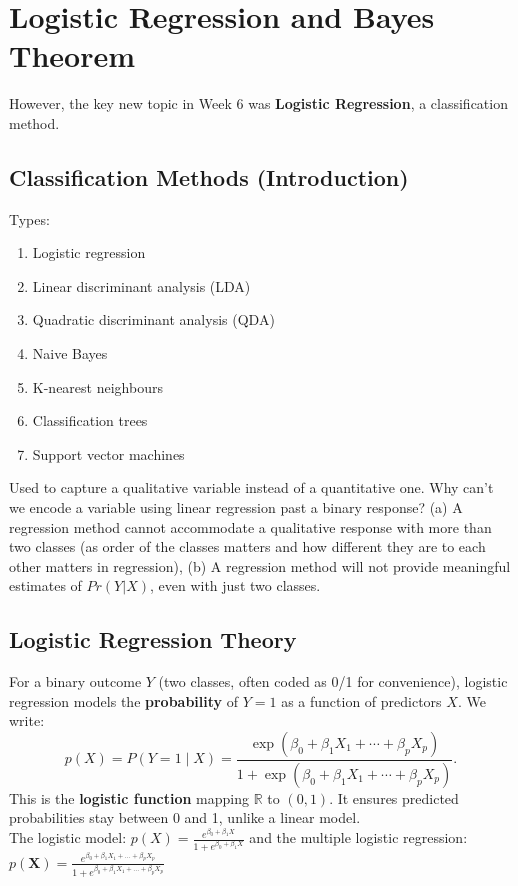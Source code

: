 \documentclass[11pt]{article}
\begin{document}
\section{Logistic Regression and Bayes Theorem}

However, the key new topic in Week 6 was \textbf{Logistic Regression}, a classification method.

\subsection{Classification Methods (Introduction)}
Types:
\begin{enumerate}
    \item Logistic regression
    \item Linear discriminant analysis (LDA)
    \item Quadratic discriminant analysis (QDA)
    \item Naive Bayes
    \item K-nearest neighbours
    \item Classification trees
    \item Support vector machines
\end{enumerate}
\vspace{1em} \noindent Used to capture a qualitative variable instead of a quantitative one. Why can't we encode a variable using linear regression past a binary response? (a) A regression method cannot accommodate a qualitative response with more than two classes (as order of the classes matters and how different they are to each other matters in regression), (b) A regression method will not provide meaningful estimates of $Pr(Y|X)$, even with just two classes.


\subsection{Logistic Regression Theory}
For a binary outcome $Y$ (two classes, often coded as 0/1 for convenience), logistic regression models the \textbf{probability} of $Y=1$ as a function of predictors $X$. We write:
\[ p(X) = P(Y=1 \mid X) = \frac{\exp(\beta_0 + \beta_1 X_1 + \cdots + \beta_p X_p)}{1 + \exp(\beta_0 + \beta_1 X_1 + \cdots + \beta_p X_p)}. \]
This is the \textbf{logistic function} mapping $\mathbb{R}$ to $(0,1)$. It ensures predicted probabilities stay between 0 and 1, unlike a linear model. \\

\noindent The logistic model: $p(X) = \frac{e^{\beta_{0}  + \beta_{1}X}}{1 + e^{\beta_{0} + \beta_{1}X}}$ and the multiple logistic regression: $p(\boldsymbol{X}) = \frac{e^{\beta_{0} + \beta_{1}X_{1} + ... + \beta_{p}X_{p}}}{1 + e^{\beta_{0} + \beta_{1}X_{1} + ... + \beta_{p}X_{p}}}$ \\
\end{document}
